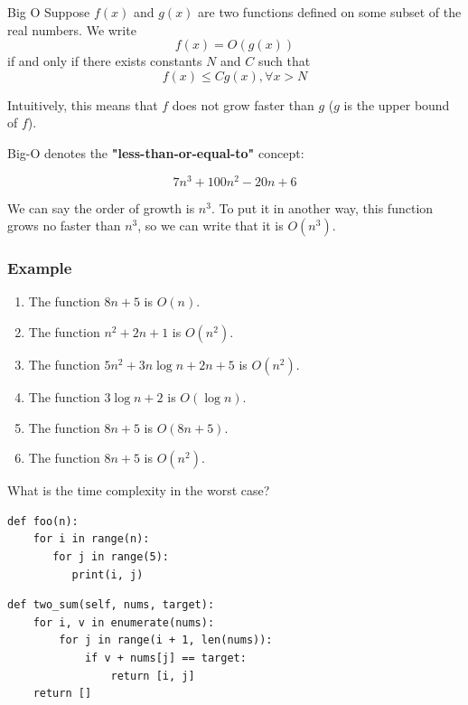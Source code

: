 \documentclass[aspectratio=169, 14pt]{beamer}
\begin{document}
\begin{frame}

	\begin{exampleblock}{Big O}
		Suppose $f(x)$ and $g(x)$ are two functions defined on some subset of the real numbers. We write
		\[f(x) = O(g(x))\]
		if and only if there exists constants $N$ and $C$ such that
		\[f(x) \leq Cg(x), \forall x > N\]
	\end{exampleblock}

	Intuitively, this means that $f$ does not grow faster than $g$ ($g$ is the \alert{upper bound} of $f$).

\end{frame}

\begin{frame}
	Big-O denotes the \textbf{"less-than-or-equal-to"} concept:

	\[7n^3 + 100n^2 - 20n + 6\]

	We can say the order of growth is $n^3$. To put it in another way, this function grows no faster than $n^3$, so we can write that it is $O(n^3)$.
\end{frame}

\begin{frame}[fragile]
	\frametitle{Example}
	\begin{enumerate}
		\item The function $8n + 5$ is $O(n)$.
		\item The function $n^2 + 2n + 1$ is $O(n^2)$.
		\item The function $5n^2 + 3n\log{n} + 2n + 5$ is $O(n^2)$.
		\item The function $3\log{n} + 2$ is $O(\log{n})$.
		\item The function $8n + 5$ is $O(8n + 5)$.
		\item The function $8n + 5$ is $O(n^2)$.
	\end{enumerate}
	\pause

\end{frame}

\begin{frame}[fragile]

	{\large {}} What is the time complexity in the worst case? 	\begin{verbatim}
def foo(n):
    for i in range(n):
       for j in range(5):
          print(i, j)
\end{verbatim}

	\begin{verbatim}
def two_sum(self, nums, target):
    for i, v in enumerate(nums):
        for j in range(i + 1, len(nums)):
            if v + nums[j] == target:
                return [i, j]
    return []
    \end{verbatim}
\end{frame}
\end{document}
